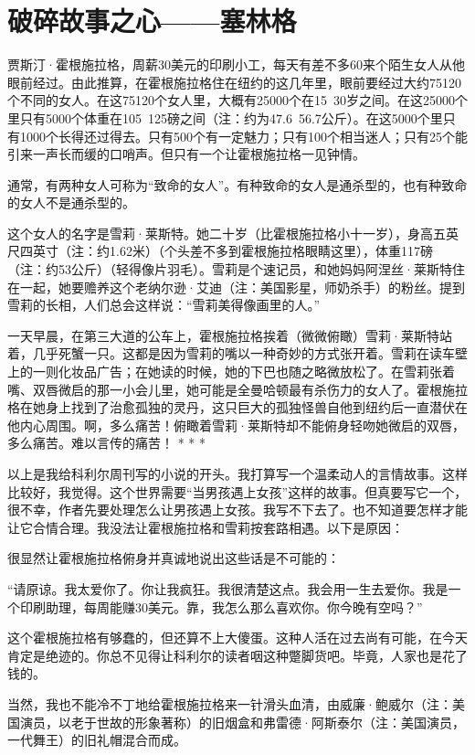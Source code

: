 \section{破碎故事之心——塞林格}

贾斯汀·霍根施拉格，周薪30美元的印刷小工，每天有差不多60来个陌生女人从他眼前经过。由此推算，在霍根施拉格住在纽约的这几年里，眼前要经过大约75120个不同的女人。在这75120个女人里，大概有25000个在15~30岁之间。在这25000个里只有5000个体重在105~125磅之间（注：约为47.6~56.7公斤）。在这5000个里只有1000个长得还过得去。只有500个有一定魅力；只有100个相当迷人；只有25个能引来一声长而缓的口哨声。但只有一个让霍根施拉格一见钟情。

通常，有两种女人可称为“致命的女人”。有种致命的女人是通杀型的，也有种致命的女人不是通杀型的。

这个女人的名字是雪莉·莱斯特。她二十岁（比霍根施拉格小十一岁），身高五英尺四英寸（注：约1.62米）（个头差不多到霍根施拉格眼睛这里），体重117磅（注：约53公斤）（轻得像片羽毛）。雪莉是个速记员，和她妈妈阿涅丝·莱斯特住在一起，她要赡养这个老纳尔逊·艾迪（注：美国影星，师奶杀手）的粉丝。提到雪莉的长相，人们总会这样说：“雪莉美得像画里的人。”

一天早晨，在第三大道的公车上，霍根施拉格挨着（微微俯瞰）雪莉·莱斯特站着，几乎死蟹一只。这都是因为雪莉的嘴以一种奇妙的方式张开着。雪莉在读车壁上的一则化妆品广告；在她读的时候，她的下巴也随之略微放松了。在雪莉张着嘴、双唇微启的那一小会儿里，她可能是全曼哈顿最有杀伤力的女人了。霍根施拉格在她身上找到了治愈孤独的灵丹，这只巨大的孤独怪兽自他到纽约后一直潜伏在他内心周围。啊，多么痛苦！俯瞰着雪莉·莱斯特却不能俯身轻吻她微启的双唇，多么痛苦。难以言传的痛苦！
* * *

以上是我给科利尔周刊写的小说的开头。我打算写一个温柔动人的言情故事。这样比较好，我觉得。这个世界需要“当男孩遇上女孩”这样的故事。但真要写它一个，很不幸，作者先要处理怎么让男孩遇上女孩。我写不下去了。也不知道要怎样才能让它合情合理。我没法让霍根施拉格和雪莉按套路相遇。以下是原因：

很显然让霍根施拉格俯身并真诚地说出这些话是不可能的：

“请原谅。我太爱你了。你让我疯狂。我很清楚这点。我会用一生去爱你。我是一个印刷助理，每周能赚30美元。靠，我怎么那么喜欢你。你今晚有空吗？”

这个霍根施拉格有够蠢的，但还算不上大傻蛋。这种人活在过去尚有可能，在今天肯定是绝迹的。你总不见得让科利尔的读者咽这种蹩脚货吧。毕竟，人家也是花了钱的。

当然，我也不能冷不丁地给霍根施拉格来一针滑头血清，由威廉·鲍威尔（注：美国演员，以老于世故的形象著称）的旧烟盒和弗雷德·阿斯泰尔（注：美国演员，一代舞王）的旧礼帽混合而成。

